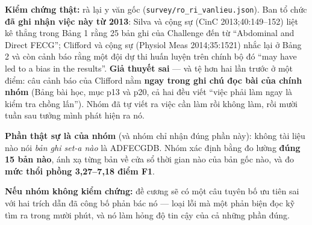 \textbf{Kiểm chứng thật:} rà lại y văn gốc (\texttt{survey/ro\_ri\_vanlieu.json}). Ban tổ chức
\textbf{đã ghi nhận việc này từ 2013}: Silva và cộng sự (CinC 2013;40:149--152) liệt kê thẳng trong
Bảng 1 rằng 25 bản ghi của Challenge đến từ ``Abdominal and Direct FECG''; Clifford và cộng sự
(Physiol Meas 2014;35:1521) nhắc lại ở Bảng 2 và còn cảnh báo rằng một đội dự thi huấn luyện trên chính
bộ đó ``may have led to a bias in the results''. \textbf{Giả thuyết sai} --- và tệ hơn hai lần trước ở
một điểm: câu cảnh báo của Clifford nằm \textbf{ngay trong ghi chú đọc bài của chính nhóm} (Bảng bài
học, mục p13 và p20, cả hai đều viết ``việc phải làm ngay là kiểm tra chồng lấn''). Nhóm đã tự viết ra
việc cần làm rồi không làm, rồi mười tuần sau tưởng mình phát hiện ra nó.

\textbf{Phần thật sự là của nhóm} (và nhóm chỉ nhận đúng phần này): không tài liệu nào nói \emph{bản ghi
set-a nào} là ADFECGDB. Nhóm xác định bằng đo lường \textbf{đúng 15 bản nào}, ánh xạ từng bản về cửa sổ
thời gian nào của bản gốc nào, và đo \textbf{mức thổi phồng 3,27--7,18 điểm F1}.

\textbf{Nếu nhóm không kiểm chứng:} đề cương sẽ có một câu tuyên bố ưu tiên sai với hai trích dẫn đã
công bố phản bác nó --- loại lỗi mà một phản biện đọc kỹ tìm ra trong mười phút, và nó làm hỏng độ tin
cậy của cả những phần đúng.

